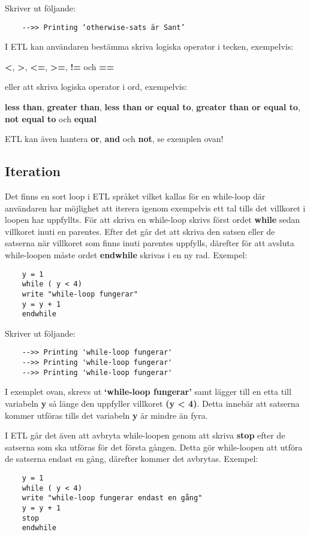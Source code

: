 \documentclass{TDP019mall}
\begin{document}
Skriver ut följande:
\begin{verbatim}
    -->> Printing ‘otherwise-sats är Sant’
\end{verbatim}

I ETL kan användaren bestämma skriva logiska operator i tecken, exempelvis: 

\textbf{<}, \textbf{>}, \textbf{<=}, \textbf{>=}, \textbf{!=} och \textbf{==} 

eller att skriva logiska operator i ord, exempelvis:

\textbf{less than}, \textbf{greater than}, \textbf{less than or equal to}, \textbf{greater than or equal to}, \textbf{not equal to} och \textbf{equal} 
\break 

ETL kan även hantera \textbf{or}, \textbf{and} och \textbf{not}, se exemplen ovan!

\subsection{Iteration}
Det finns en sort loop i ETL språket vilket kallas för en while-loop där användaren har möjlighet att iterera igenom exempelvis ett tal tills det villkoret i loopen har uppfyllts. 
För att skriva en while-loop skrivs först ordet \textbf{while} sedan villkoret inuti en parentes. Efter det går det att skriva den satsen eller de satserna när villkoret som finns inuti parentes uppfylls, därefter för att avsluta while-loopen måste ordet \textbf{endwhile} skrivas i en ny rad. 
Exempel: 
\begin{verbatim}
    y = 1
    while ( y < 4)
    write "while-loop fungerar"
    y = y + 1
    endwhile
\end{verbatim}
 
Skriver ut följande:
\begin{verbatim}
    -->> Printing 'while-loop fungerar'
    -->> Printing 'while-loop fungerar'
    -->> Printing 'while-loop fungerar'
\end{verbatim}
 
I exemplet ovan, skrevs ut \textbf{‘while-loop fungerar’} samt lägger till en etta till variabeln \textbf{y} så länge den 
uppfyller villkoret \textbf{(y < 4)}. Detta innebär att satserna kommer utföras tills det variabeln \textbf{y} är mindre än fyra. 
 
I ETL går det även att avbryta while-loopen genom att skriva \textbf{stop} efter de satserna som ska utföras för det första gången. 
Detta gör while-loopen att utföra de satserna endast en gång, därefter kommer det avbrytas.
\newpage
Exempel: 
\begin{verbatim}
    y = 1
    while ( y < 4)
    write "while-loop fungerar endast en gång"
    y = y + 1
    stop
    endwhile
\end{verbatim}
 
\end{document}
